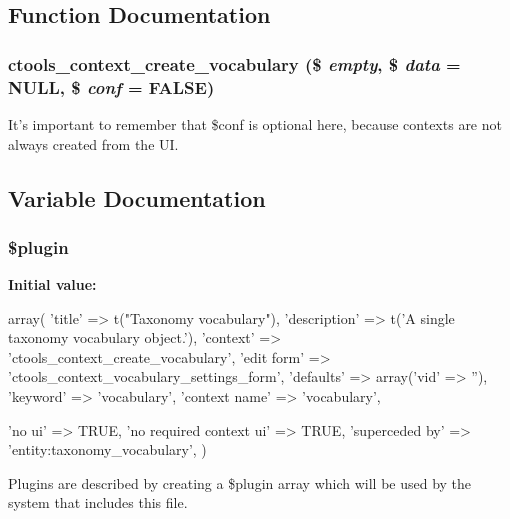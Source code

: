 \subsection{Function Documentation}
\hypertarget{vocabulary_8inc_ae43e953ad5b23f153266d758a4cee903}{
\subsubsection[{ctools\_\-context\_\-create\_\-vocabulary}]{\setlength{\rightskip}{0pt plus 5cm}ctools\_\-context\_\-create\_\-vocabulary (\$ {\em empty}, \/  \$ {\em data} = {\ttfamily NULL}, \/  \$ {\em conf} = {\ttfamily FALSE})}}
\label{vocabulary_8inc_ae43e953ad5b23f153266d758a4cee903}
It's important to remember that \$conf is optional here, because contexts are not always created from the UI. 

\subsection{Variable Documentation}
\hypertarget{vocabulary_8inc_ada8a7130088351710bb02ed622d6bf65}{
\subsubsection[{\$plugin}]{\setlength{\rightskip}{0pt plus 5cm}\$plugin}}
\label{vocabulary_8inc_ada8a7130088351710bb02ed622d6bf65}
{\bfseries Initial value:}
\begin{DoxyCode}
 array(
  'title' => t("Taxonomy vocabulary"),
  'description' => t('A single taxonomy vocabulary object.'),
  'context' => 'ctools_context_create_vocabulary',
  'edit form' => 'ctools_context_vocabulary_settings_form',
  'defaults' => array('vid' => ''),
  'keyword' => 'vocabulary',
  'context name' => 'vocabulary',
  
  'no ui' => TRUE,
  'no required context ui' => TRUE,
  'superceded by' => 'entity:taxonomy_vocabulary',
)
\end{DoxyCode}
Plugins are described by creating a \$plugin array which will be used by the system that includes this file. 